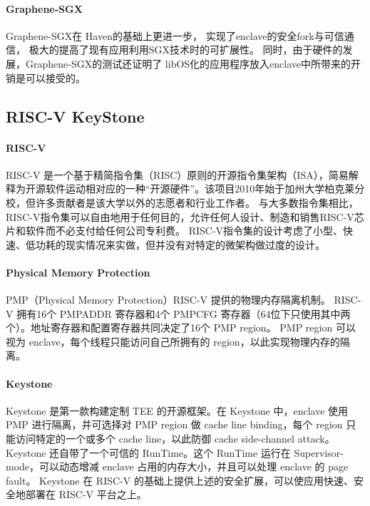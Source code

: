 \paragraph{Graphene-SGX}Graphene-SGX\cite{graphene}在 Haven的基础上更进一步，
实现了enclave的安全fork与可信通信，
极大的提高了现有应用利用SGX技术时的可扩展性。
同时，由于硬件的发展，Graphene-SGX的测试还证明了
libOS化的应用程序放入enclave中所带来的开销是可以接受的。

\subsection{RISC-V KeyStone}
\paragraph{RISC-V}
RISC-V\cite{keystone-p4} 是一个基于精简指令集（RISC）原则的开源指令集架构（ISA），简易解释为开源软件运动相对应的一种“开源硬件”。该项目2010年始于加州大学柏克莱分校，但许多贡献者是该大学以外的志愿者和行业工作者。
与大多数指令集相比，RISC-V指令集可以自由地用于任何目的，允许任何人设计、制造和销售RISC-V芯片和软件而不必支付给任何公司专利费。
RISC-V指令集的设计考虑了小型、快速、低功耗的现实情况来实做，但并没有对特定的微架构做过度的设计。
\paragraph{Physical Memory Protection}
PMP（Physical Memory Protection）RISC-V 提供的物理内存隔离机制\cite{keystone-p4}。
RISC-V 拥有16个 PMPADDR 寄存器和4个 PMPCFG 寄存器（64位下只使用其中两个）\cite{keystone-p2}。地址寄存器和配置寄存器共同决定了16个 PMP region。
PMP region 可以视为 enclave，每个线程只能访问自己所拥有的 region，以此实现物理内存的隔离。
\paragraph{Keystone}
Keystone\cite{keystone-p1} 是第一款构建定制 TEE 的开源框架。在 Keystone 中，enclave 使用 PMP 进行隔离，并可选择对 PMP region 做 cache line binding，每个 region 只能访问特定的一个或多个 cache line，以此防御 cache side-channel attack。
Keystone 还自带了一个可信的 RunTime。这个 RunTime 运行在 Supervisor-mode，可以动态增减 enclave 占用的内存大小，并且可以处理 enclave 的 page fault。
Keystone 在 RISC-V 的基础上提供上述的安全扩展，可以使应用快速、安全地部署在 RISC-V 平台之上。